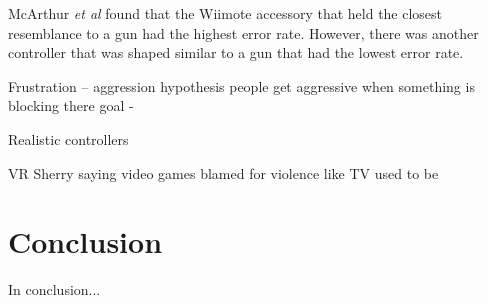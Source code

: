 \documentclass{scrartcl}
\begin{document}
McArthur \textit{et al}  found that the Wiimote accessory that held the closest resemblance to a gun had the highest error rate. However, there was another controller that was shaped similar to a gun that had the lowest error rate. \cite{McArthur}

Frustration – aggression hypothesis people get aggressive when something is blocking there goal - \cite{dollard1939frustration}   

Realistic controllers \cite{McGloin}

VR  Sherry saying video games blamed for violence like TV used to be 

\section{Conclusion}
In conclusion...

	


	
\end{document}

